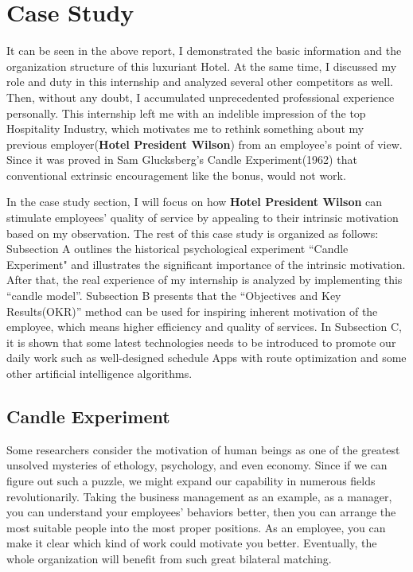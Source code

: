 \documentclass[12pt,onecolumn,a4paper]{IEEEtran}
\begin{document}
\newpage
\section{\textbf{Case Study}}
It can be seen in the above report, I demonstrated the basic information and the organization structure of this luxuriant Hotel. At the same time, I discussed my role and duty in this internship and analyzed several other competitors as well. Then, without any doubt, I accumulated unprecedented professional experience personally. This internship left me with an indelible impression of the top Hospitality Industry, which motivates me to rethink something about my previous employer(\textbf{Hotel President Wilson}) from an employee's point of view. Since it was proved in Sam Glucksberg's Candle Experiment(1962) that conventional extrinsic encouragement like the bonus, would not work. 

In the case study section, I will focus on how \textbf{Hotel President Wilson} can stimulate employees' quality of service by appealing to their intrinsic motivation based on my observation. The rest of this case study is organized as follows: Subsection A outlines the historical psychological experiment ``Candle Experiment" and illustrates the significant importance of the intrinsic motivation. After that, the real experience of my internship is analyzed by implementing this ``candle model''. Subsection B presents that the ``Objectives and Key Results(OKR)'' method can be used for inspiring inherent motivation of the employee, which means higher efficiency and quality of services. In Subsection C, it is shown that some latest technologies needs to be introduced to promote our daily work such as well-designed schedule Apps with route optimization and some other artificial intelligence algorithms.

\subsection{\textbf{Candle Experiment}}
Some researchers consider the motivation of human beings as one of the greatest unsolved mysteries of ethology, psychology, and even economy. Since if we can figure out such a puzzle, we might expand our capability in numerous fields revolutionarily. Taking the business management as an example, as a manager, you can understand your employees' behaviors better, then you can arrange the most suitable people into the most proper positions. As an employee, you can make it clear which kind of work could motivate you better. Eventually, the whole organization will benefit from such great bilateral matching. 
\end{document}
